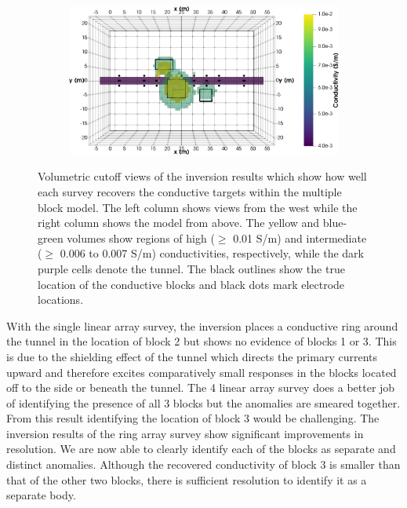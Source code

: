 \documentclass[preprint,authoryear,12pt]{elsarticle}
\begin{document}
\begin{figure}[htp]{}
\begin{center}
\begin{subfigure}{0.55\linewidth}
      \end{subfigure}
      \hspace{-4.0cm}
      \qquad
      \begin{subfigure}{0.55\linewidth}
         \label{fig:MultiBlk_StraightTunnel_Ring_Top}
         \includegraphics[trim=0cm 0cm 0cm 0cm, clip=true,width=\linewidth]{./figures/Fig11f.png}
      \end{subfigure}
   \end{center}
\vspace{-0.55cm}
\caption{Volumetric cutoff views of the inversion results which show how well each survey recovers the conductive targets within the multiple block model. The left column shows views from the west while the right column shows the model from above. The yellow and blue-green volumes show regions of high ($\geq$ 0.01 S/m) and intermediate ($\geq$ 0.006 to 0.007 S/m) conductivities, respectively, while the dark purple cells denote the tunnel. The black outlines show the true location of the conductive blocks and black dots mark electrode locations.}
\label{fig:StraightTunnel_MultiBlk_Isosurfaces}
\end{figure}

With the single linear array survey, the inversion places a conductive ring around the tunnel in the location of block 2 but shows no evidence of blocks 1 or 3. This is due to the shielding effect of the tunnel which directs the primary currents upward and therefore excites comparatively small responses in the blocks located off to the side or beneath the tunnel. The 4 linear array survey does a better job of identifying the presence of all 3 blocks but the anomalies are smeared together. From this result identifying the location of block 3 would be challenging. The inversion results of the ring array survey show significant improvements in resolution. We are now able to clearly identify each of the blocks as separate and distinct anomalies. Although the recovered conductivity of block 3 is smaller than that of the other two blocks, there is sufficient resolution to identify it as a separate body.
\end{document}
